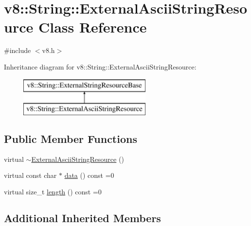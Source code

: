 \hypertarget{classv8_1_1_string_1_1_external_ascii_string_resource}{}\section{v8\+:\+:String\+:\+:External\+Ascii\+String\+Resource Class Reference}
\label{classv8_1_1_string_1_1_external_ascii_string_resource}


{\ttfamily \#include $<$v8.\+h$>$}

Inheritance diagram for v8\+:\+:String\+:\+:External\+Ascii\+String\+Resource\+:\begin{figure}[H]
\begin{center}
\leavevmode
\includegraphics[height=2.000000cm]{classv8_1_1_string_1_1_external_ascii_string_resource}
\end{center}
\end{figure}
\subsection*{Public Member Functions}
\begin{DoxyCompactItemize}
\item 
virtual \hyperlink{classv8_1_1_string_1_1_external_ascii_string_resource_acd8790ae14be1b90794b363d24a147d0}{$\sim$\+External\+Ascii\+String\+Resource} ()
\item 
virtual const char $\ast$ \hyperlink{classv8_1_1_string_1_1_external_ascii_string_resource_adeb99e8c8c630e2dac5ad76476249d2f}{data} () const =0
\item 
virtual size\+\_\+t \hyperlink{classv8_1_1_string_1_1_external_ascii_string_resource_aeecccc52434c2057d3dc5c9732458a8e}{length} () const =0
\end{DoxyCompactItemize}
\subsection*{Additional Inherited Members}


